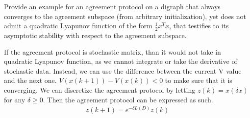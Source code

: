 \documentclass{article}
\begin{document}
\begin{problem}
    Provide an example for an agreement protocol on a digraph that always converges to the agreement subspace (from arbitrary initialization), yet does not admit a quadratic Lyapunov function of the form $\frac{1}{2} x^T x$, that testiﬁes to its asymptotic stability with respect to the agreement subspace.

    If the agreement protocol is stochastic matrix, than it would not take in quadratic Lyapunov function, as we cannot integrate or take the derivative of stochastic data. Instead, we can use the difference between the current V value and the next one. $V(x(k+1)) - V(x(k)) < 0 $ to make sure that it is converging. We can discretize the agreement protocol by letting $z(k) = x(\delta x)$ for any $\delta \geq 0$. Then the agreement protocol can be expressed as such. 
    \begin{align*}
        z(k+1) = e^{-\delta L(D)}z(k)
    \end{align*}
\end{problem}
\end{document}
